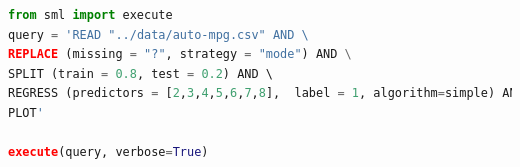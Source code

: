 \begin{lstlisting}[language=python,  caption={SML \(Query\) that performs regression on the Auto-MPG dataset using Linear Regression.}, label={lst:SML:AutoMPGQuery}]
from sml import execute
query = 'READ "../data/auto-mpg.csv" AND \ 
REPLACE (missing = "?", strategy = "mode") AND \
SPLIT (train = 0.8, test = 0.2) AND \ 
REGRESS (predictors = [2,3,4,5,6,7,8],  label = 1, algorithm=simple) AND \
PLOT'

execute(query, verbose=True)
\end{lstlisting}



\clearpage



\clearpage

